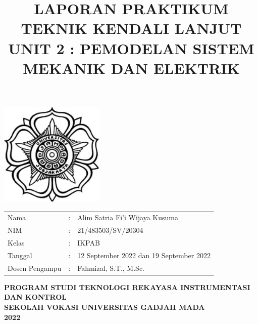\documentclass[12 pt]{article}
\title{\large \textbf{LAPORAN PRAKTIKUM TEKNIK KENDALI LANJUT} \\ \textbf{UNIT 2 : PEMODELAN SISTEM MEKANIK DAN ELEKTRIK}\linebreak}
\author{}
\date{}
\begin{document}
\clearpage
\maketitle
\thispagestyle{empty} %

\begin{center}
\includegraphics[width=5cm,height=5cm]{cover_laporan/logo_ugm.png}
\end{center}

\vspace{1 cm}

\begin{center}
\begin{tabular}{lcl}
Nama & : & Alim Satria Fi'i Wijaya Kusuma \\
NIM & : & 21/483503/SV/20304\\
Kelas & : & IKPAB\\
Tanggal & : & 12 September 2022 dan 19 September 2022 \\
Dosen Pengampu & : & Fahmizal, S.T., M.Sc.
\end{tabular}
\newline
\newline
\newline
\newline
\large{\textbf{PROGRAM STUDI TEKNOLOGI REKAYASA INSTRUMENTASI DAN KONTROL}} \\
\textbf{SEKOLAH VOKASI UNIVERSITAS GADJAH MADA} \\
\textbf{2022}
\end{center}

\pagebreak
\tableofcontents
\pagebreak
\listoffigures
\pagebreak


\end{document}
